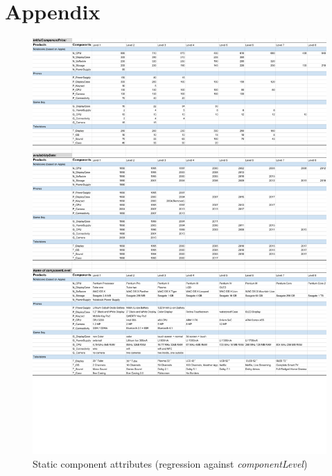 \documentclass[11pt,titlepage,oneside,openany]{book}
\begin{document}
\chapter{Appendix}
\label{cha:appendix}

\begin{figure}
    \centering
    \includegraphics[trim=0cm 5cm 0cm 0cm, scale = 0.75]{images/staticComponentAttributes.pdf}
    \caption{Static component attributes (regression against \textit{componentLevel})}
    \label{fig:staticComponentAttributes}
\end{figure}


\newpage


\pagestyle{empty}
\end{document}
